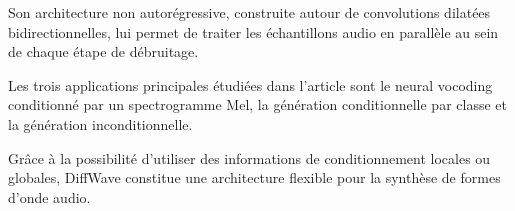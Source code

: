 Son architecture non autorégressive, construite autour de
convolutions dilatées bidirectionnelles, lui permet de traiter
les échantillons audio en parallèle au sein de chaque étape
de débruitage.

Les trois applications principales étudiées dans l'article
sont le neural vocoding conditionné par un spectrogramme Mel,
la génération conditionnelle par classe et la génération
inconditionnelle.

Grâce à la possibilité d'utiliser des informations de
conditionnement locales ou globales, DiffWave constitue
une architecture flexible pour la synthèse de formes d'onde
audio.
